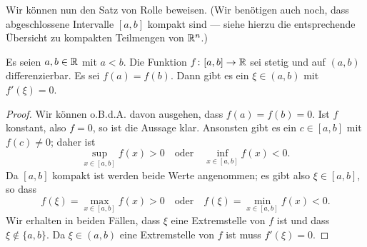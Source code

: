 \documentclass[a4paper,10pt]{article}
\begin{document}
Wir können nun den Satz von Rolle beweisen. (Wir benötigen auch noch, dass abgeschlossene Intervalle $[a,b]$ kompakt sind --- siehe hierzu die entsprechende Übersicht zu kompakten Teilmengen von $\mathbb{R}^n$.)


\begin{thrm}[Rolle]
 Es seien $a,b \in \mathbb{R}$ mit $a < b$. Die Funktion $f \colon [a,b] \to \mathbb{R}$ sei stetig und auf $(a,b)$ differenzierbar. Es sei $f(a) = f(b)$. Dann gibt es ein $\xi \in (a,b)$ mit $f'(\xi) = 0$. 
\end{thrm}
\begin{proof}
 Wir können o.B.d.A. davon ausgehen, dass $f(a) = f(b) = 0$.  Ist $f$ konstant, also $f = 0$, so ist die Aussage klar. Ansonsten gibt es ein $c \in [a,b]$ mit $f(c) \neq 0$; daher ist
 \[
  \sup_{x \in [a,b]} f(x) > 0 \quad \text{oder} \quad \inf_{x \in [a,b]} f(x) < 0.
 \]
 Da $[a,b]$ kompakt ist werden beide Werte angenommen; es gibt also $\xi \in [a,b]$, so dass
 \[
  f(\xi) = \max_{x \in [a,b]} f(x) > 0 \quad \text{oder} \quad f(\xi) = \min_{x \in [a,b]} f(x) < 0.
 \]
 Wir erhalten in beiden Fällen, dass $\xi$ eine Extremstelle von $f$ ist und dass $\xi \notin \{a,b\}$. Da $\xi \in (a,b)$ eine Extremstelle von $f$ ist muss $f'(\xi) = 0$.
\end{proof}
\end{document}
